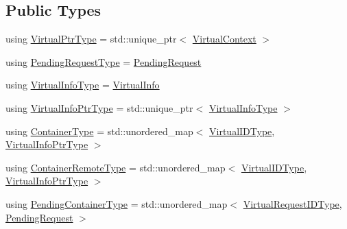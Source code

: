 \subsection*{Public Types}
\begin{DoxyCompactItemize}
\item 
using \hyperlink{structvt_1_1vrt_1_1_virtual_context_manager_a24dd2acbbd37a53f4e4108d385a58441}{Virtual\+Ptr\+Type} = std\+::unique\+\_\+ptr$<$ \hyperlink{structvt_1_1vrt_1_1_virtual_context}{Virtual\+Context} $>$
\item 
using \hyperlink{structvt_1_1vrt_1_1_virtual_context_manager_a0d3901c038c192969202b16e4ab05d8a}{Pending\+Request\+Type} = \hyperlink{structvt_1_1vrt_1_1_pending_request}{Pending\+Request}
\item 
using \hyperlink{structvt_1_1vrt_1_1_virtual_context_manager_ad2cd828dbd8886166b4ceb3776c49239}{Virtual\+Info\+Type} = \hyperlink{structvt_1_1vrt_1_1_virtual_info}{Virtual\+Info}
\item 
using \hyperlink{structvt_1_1vrt_1_1_virtual_context_manager_aa63e106c968a01d4d437d535c4ef9d02}{Virtual\+Info\+Ptr\+Type} = std\+::unique\+\_\+ptr$<$ \hyperlink{structvt_1_1vrt_1_1_virtual_context_manager_ad2cd828dbd8886166b4ceb3776c49239}{Virtual\+Info\+Type} $>$
\item 
using \hyperlink{structvt_1_1vrt_1_1_virtual_context_manager_ab36ffbed916fb2720dd6db71979a064e}{Container\+Type} = std\+::unordered\+\_\+map$<$ \hyperlink{namespacevt_1_1vrt_a84d0891f52f70728c3fc2172cffb464b}{Virtual\+I\+D\+Type}, \hyperlink{structvt_1_1vrt_1_1_virtual_context_manager_aa63e106c968a01d4d437d535c4ef9d02}{Virtual\+Info\+Ptr\+Type} $>$
\item 
using \hyperlink{structvt_1_1vrt_1_1_virtual_context_manager_aa0314e4b3f1b39a531c7ba5b630fc72e}{Container\+Remote\+Type} = std\+::unordered\+\_\+map$<$ \hyperlink{namespacevt_1_1vrt_a84d0891f52f70728c3fc2172cffb464b}{Virtual\+I\+D\+Type}, \hyperlink{structvt_1_1vrt_1_1_virtual_context_manager_aa63e106c968a01d4d437d535c4ef9d02}{Virtual\+Info\+Ptr\+Type} $>$
\item 
using \hyperlink{structvt_1_1vrt_1_1_virtual_context_manager_a85080f8107ed08c3a7fdd8114c724ce2}{Pending\+Container\+Type} = std\+::unordered\+\_\+map$<$ \hyperlink{namespacevt_1_1vrt_ac7ef8820ebfc383fa16f09bf46eaa2b8}{Virtual\+Request\+I\+D\+Type}, \hyperlink{structvt_1_1vrt_1_1_pending_request}{Pending\+Request} $>$
\end{DoxyCompactItemize}
